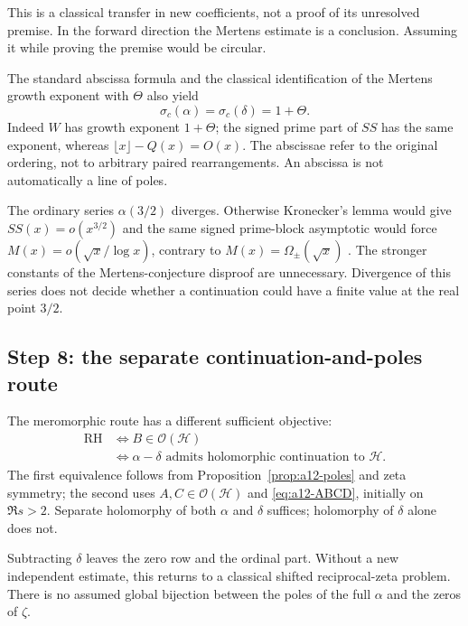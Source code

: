 \documentclass[11pt]{amsart}
\numberwithin{equation}{section}
\theoremstyle{plain}
\theoremstyle{definition}
\theoremstyle{remark}
\begin{document}
This is a classical transfer in new coefficients, not a proof of its
unresolved premise. In the forward direction the Mertens estimate is
a conclusion. Assuming it while proving the premise would be circular.

The standard abscissa formula and the classical identification of the
Mertens growth exponent with $\Theta$ also yield
\begin{equation}
\label{eq:a12-abscissae}
\sigma_c(\alpha)=\sigma_c(\delta)=1+\Theta.
\end{equation}
Indeed $W$ has growth exponent $1+\Theta$; the signed prime part of $SS$
has the same exponent, whereas $\lfloor x\rfloor-Q(x)=O(x)$.
The abscissae refer to the original ordering, not to arbitrary paired
rearrangements. An abscissa is not automatically a line of poles.

The ordinary series $\alpha(3/2)$ diverges. Otherwise Kronecker's lemma
would give $SS(x)=o(x^{3/2})$ and the same signed prime-block asymptotic
would force $M(x)=o(\sqrt x/\log x)$, contrary to
$M(x)=\Omega_\pm(\sqrt x)$ \cite{Ng2004,OdlyzkoTeRiele1985}.
The stronger constants of the Mertens-conjecture disproof are unnecessary.
Divergence of this series does not decide whether a continuation could
have a finite value at the real point $3/2$.
\subsection{Step 8: the separate continuation-and-poles route}
\label{subsec:a12-continuation}
The meromorphic route has a different sufficient objective:
\begin{equation}
\label{eq:a12-analytic-criterion}
\boxed{
\begin{aligned}
\mathrm{RH}&\Longleftrightarrow B\in\mathcal O(\mathcal H)\\
&\Longleftrightarrow
\alpha-\delta\text{ admits holomorphic continuation to }\mathcal H.
\end{aligned}}
\end{equation}
The first equivalence follows from Proposition~\ref{prop:a12-poles} and
zeta symmetry; the second uses $A,C\in\mathcal O(\mathcal H)$ and
\eqref{eq:a12-ABCD}, initially on $\Re s>2$.
Separate holomorphy of both $\alpha$ and $\delta$ suffices; holomorphy of
$\delta$ alone does not.

Subtracting $\delta$ leaves the zero row and the ordinal part.
Without a new independent estimate, this returns to a classical shifted
reciprocal-zeta problem. There is no assumed global bijection between
the poles of the full $\alpha$ and the zeros of $\zeta$.
\end{document}
